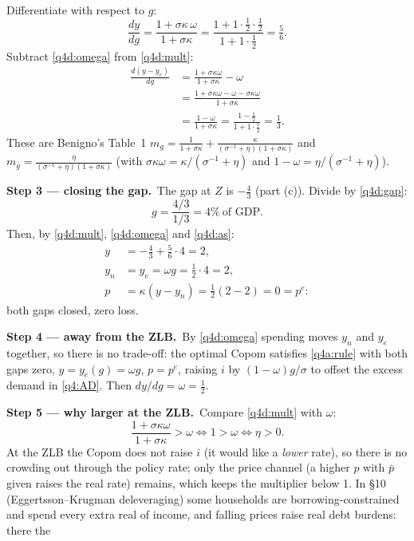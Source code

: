 \documentclass[11pt,a4paper]{article}
\newcommand{\passo}[2]{\par\smallskip\noindent\textbf{Step #1.}~#2}
\begin{document}
\begin{sol}
{\begin{align*}
\end{align*}
Differentiate with respect to $g$:
\begin{equation}
\boxed{\frac{dy}{dg}=\frac{1+\sigma\kappa\,\omega}{1+\sigma\kappa}}
=\frac{1+1\cdot\frac12\cdot\frac12}{1+1\cdot\frac12}=\boxed{\tfrac56}.
\label{q4d:mult}
\end{equation}
Subtract \eqref{q4d:omega} from \eqref{q4d:mult}:
\begin{align}
\frac{d(y-y_e)}{dg} &= \frac{1+\sigma\kappa\omega}{1+\sigma\kappa}-\omega\nonumber\\
&= \frac{1+\sigma\kappa\omega-\omega-\sigma\kappa\omega}{1+\sigma\kappa}\nonumber\\
&= \boxed{\frac{1-\omega}{1+\sigma\kappa}}=\frac{1-\frac12}{1+1\cdot\frac12}=\boxed{\tfrac13}. \label{q4d:gap}
\end{align}
These are Benigno's Table~1 $m_g=\frac{1}{1+\sigma\kappa}+\frac{\kappa}{(\sigma^{-1}+\eta)(1+\sigma\kappa)}$ and
$m_{\bar g}=\frac{\eta}{(\sigma^{-1}+\eta)(1+\sigma\kappa)}$ (with $\sigma\kappa\omega=\kappa/(\sigma^{-1}+\eta)$ and
$1-\omega=\eta/(\sigma^{-1}+\eta)$).}
\passo{3 --- closing the gap}{The gap at $Z$ is $-\tfrac43$ (part (c)). Divide by \eqref{q4d:gap}:
\[
g=\frac{4/3}{1/3}=\boxed{4\%}\ \text{of GDP}.
\]
Then, by \eqref{q4d:mult}, \eqref{q4d:omega} and \eqref{q4d:as}:
\begin{align*}
y &= -\tfrac43+\tfrac56\cdot4=\boxed{2},\\
y_n &= y_e=\omega g=\tfrac12\cdot4=2,\\
p &= \kappa(y-y_n)=\tfrac12(2-2)=\boxed{0=p^e}:
\end{align*}
both gaps closed, zero loss.}
\passo{4 --- away from the ZLB}{By \eqref{q4d:omega} spending moves $y_n$ and $y_e$ together, so there is no
trade-off: the optimal Copom satisfies \eqref{q4a:rule} with both gaps zero, $y=y_e(g)=\omega g$, $p=p^e$, raising
$i$ by $(1-\omega)g/\sigma$ to offset the excess demand in \eqref{q4:AD}. Then
$\boxed{dy/dg=\omega=\tfrac12}$.}
\passo{5 --- why larger at the ZLB}{Compare \eqref{q4d:mult} with $\omega$:
\[
\frac{1+\sigma\kappa\omega}{1+\sigma\kappa}>\omega\iff1>\omega\iff\eta>0.
\]
At the ZLB the Copom does not raise $i$ (it would like a \emph{lower} rate), so there is no crowding out through
the policy rate; only the price channel (a higher $p$ with $\bar p$ given raises the real rate) remains, which
keeps the multiplier below 1. In \S10 (Eggertsson--Krugman deleveraging) some households are
borrowing-constrained and spend every extra real of income, and falling prices raise real debt burdens: there the
}
\end{sol}
\end{document}
